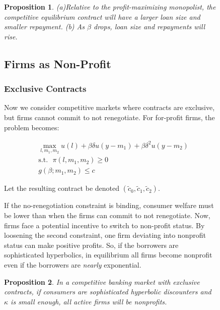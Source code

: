 \documentclass[11pt]{article}%
\newtheorem{proposition}{Proposition}
\begin{document}
\begin{figure}
{\begin{proposition}
(a)Relative to the profit-maximizing monopolist, the competitive equilibrium
contract will have a larger loan size and smaller repayment. (b) As $\beta$
drops, loan size and repayments will rise.
\end{proposition}

\subsection{Firms as Non-Profit}

\subsubsection{Exclusive Contracts}

Now we consider competitive markets where contracts are exclusive, but firms
cannot commit to not renegotiate. For for-profit firms, the problem becomes:%

\begin{align*}
&  \max_{l,m_{1},m_{2}}u\left(  l\right)  +\beta\delta u\left(  y-m_{1}%
\right)  +\beta\delta^{2}u\left(  y-m_{2}\right) \\
&  \text{s}\text{.t}\text{.}\text{ }\pi\left(  l,m_{1},m_{2}\right)  \geq0\\
&  g\left(  \beta;m_{1},m_{2}\right)  \leq c
\end{align*}


Let the resulting contract be denoted $\left(  \tilde{c}_{0},\tilde{c}%
_{1},\tilde{c}_{2}\right)  $.

If the no-renegotiation constraint is binding, consumer welfare must be lower
than when the firms can commit to not renegotiate. Now, firms face a potential
incentive to switch to non-profit status. By loosening the second constraint,
one firm deviating into nonprofit status can make positive profits. So, if the
borrowers are sophisticated hyperbolics, in equilibrium all firms become
nonprofit even if the borrowers are \textit{nearly} exponential.

\begin{proposition}
In a competitive banking market with exclusive contracts, if consumers are
sophisticated hyperbolic discounters and $\kappa$ is small enough, all active
firms will be nonprofits.
\end{proposition}

}
\end{figure}
\end{document}
